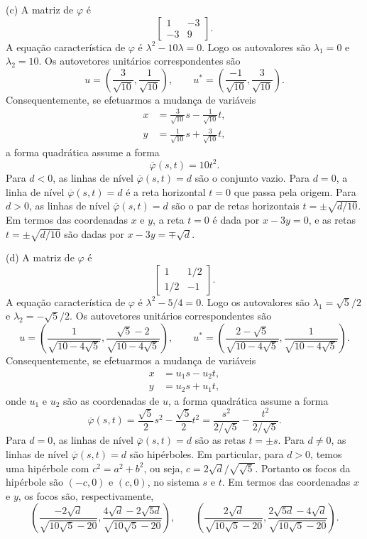 \documentclass[a4paper,11pt]{article}
\begin{document}
(c)
A matriz de $\varphi$ é
\[
  \begin{bmatrix}
    1 & -3 \\
    -3 & 9
  \end{bmatrix}.
\]
A equação característica de $\varphi$ é $\lambda^2 - 10\lambda = 0$.
Logo os autovalores são $\lambda_1 = 0$ e $\lambda_2 = 10$.
Os autovetores unitários correspondentes são
\[
  u = \left( \frac{3}{\sqrt{10}}, \frac{1}{\sqrt{10}} \right), \qquad u^* = \left( \frac{-1}{\sqrt{10}}, \frac{3}{\sqrt{10}} \right).
\]
Consequentemente, se efetuarmos a mudança de variáveis
\begin{align*}
  x & = \frac{3}{\sqrt{10}} s - \frac{1}{\sqrt{10}} t, \\
  y & = \frac{1}{\sqrt{10}} s + \frac{3}{\sqrt{10}} t,
\end{align*}
a forma quadrática assume a forma
\[
  \overline{\varphi}(s,t) = 10 t^2.
\]
Para $d < 0$, as linhas de nível $\overline{\varphi}(s,t) = d$ são o conjunto vazio.
Para $d = 0$, a linha de nível $\overline{\varphi}(s,t) = d$ é a reta horizontal $t = 0$ que passa pela origem.
Para $d > 0$, as linhas de nível $\overline{\varphi}(s,t) = d$ são o par de retas horizontais $t = \pm \sqrt{d/10}$.
Em termos das coordenadas $x$ e $y$, a reta $t = 0$ é dada por $x - 3y = 0$, e as retas $t = \pm \sqrt{d/10}$ são dadas por $x - 3y = \mp \sqrt{d}$.

(d)
A matriz de $\varphi$ é
\[
  \begin{bmatrix}
    1 & 1/2 \\
    1/2 & -1
  \end{bmatrix}.
\]
A equação característica de $\varphi$ é $\lambda^2 - 5/4 = 0$.
Logo os autovalores são $\lambda_1 = \sqrt{5}/2$ e $\lambda_2 = -\sqrt{5}/2$.
Os autovetores unitários correspondentes são
\[
  u = \left( \frac{1}{\sqrt{10 - 4\sqrt{5}}}, \frac{\sqrt{5}-2}{\sqrt{10 - 4\sqrt{5}}} \right), \qquad u^* = \left( \frac{2-\sqrt{5}}{\sqrt{10 - 4\sqrt{5}}}, \frac{1}{\sqrt{10 - 4\sqrt{5}}} \right).
\]
Consequentemente, se efetuarmos a mudança de variáveis
\begin{align*}
  x & = u_1 s - u_2 t, \\
  y & = u_2 s + u_1 t,
\end{align*}
onde $u_1$ e $u_2$ são as coordenadas de $u$, a forma quadrática assume a forma
\[
  \overline{\varphi}(s,t) = \frac{\sqrt{5}}{2} s^2 - \frac{\sqrt{5}}{2} t^2 = \frac{s^2}{2/\sqrt{5}} - \frac{t^2}{2/\sqrt{5}}.
\]
Para $d = 0$, as linhas de nível $\overline{\varphi}(s,t) = d$ são as retas $t = \pm s$.
Para $d \neq 0$, as linhas de nível $\overline{\varphi}(s,t) = d$ são hipérboles.
Em particular, para $d > 0$, temos uma hipérbole com $c^2 = a^2 + b^2$, ou seja, $c = 2\sqrt{d}/\sqrt{\sqrt{5}}$.
Portanto os focos da hipérbole são $(-c,0)$ e $(c,0)$, no sistema $s$ e $t$.
Em termos das coordenadas $x$ e $y$, os focos são, respectivamente,
\[
  \left( \frac{-2\sqrt{d}}{\sqrt{10 \sqrt{5} - 20}}, \frac{4\sqrt{d}-2\sqrt{5d}}{\sqrt{10 \sqrt{5} - 20}} \right), \qquad \left( \frac{2\sqrt{d}}{\sqrt{10 \sqrt{5} - 20}}, \frac{2\sqrt{5d}-4\sqrt{d}}{\sqrt{10 \sqrt{5} - 20}} \right).
\]
\end{document}
